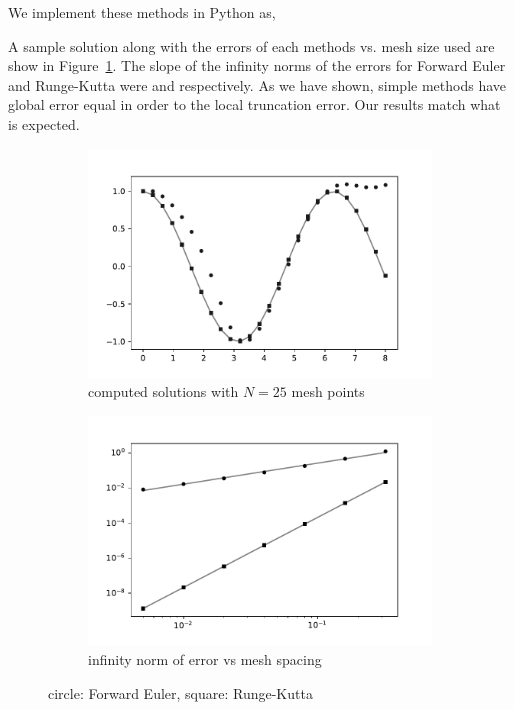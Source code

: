 \documentclass[10pt]{article}
\begin{document}
\begin{solution}[Solution]

We implement these methods in Python as,




A sample solution along with the errors of each methods vs. mesh size used are show in Figure~\ref{p5}.
The slope of the infinity norms of the errors for Forward Euler and Runge-Kutta were and respectively. As we have shown, simple methods have global error equal in order to the local truncation error. Our results match what is expected.

\begin{figure}[H]\centering
\begin{subfigure}{.48\textwidth}
    \includegraphics[width=\textwidth]{img/5/N25.pdf}
    \caption{computed solutions with \( N = 25 \) mesh points}
\end{subfigure}
\begin{subfigure}{.48\textwidth}
    \includegraphics[width=\textwidth]{img/5/error.pdf}
    \caption{infinity norm of error vs mesh spacing}
\end{subfigure}
\caption{circle: Forward Euler, square: Runge-Kutta}
\label{p5}
\end{figure}


\end{solution}
\end{document}
